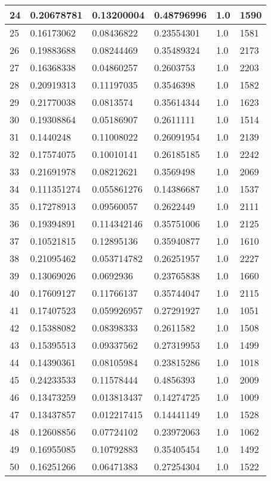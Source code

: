 \begin{longtable}{|l|l|l|l|l|l|}
24 & 0.20678781 & 0.13200004 & 0.48796996 & 1.0 & 1590 \\ \hline 
25 & 0.16173062 & 0.08436822 & 0.23554301 & 1.0 & 1581 \\ \hline 
26 & 0.19883688 & 0.08244469 & 0.35489324 & 1.0 & 2173 \\ \hline 
27 & 0.16368338 & 0.04860257 & 0.2603753 & 1.0 & 2203 \\ \hline 
28 & 0.20919313 & 0.11197035 & 0.3546398 & 1.0 & 1582 \\ \hline 
29 & 0.21770038 & 0.0813574 & 0.35614344 & 1.0 & 1623 \\ \hline 
30 & 0.19308864 & 0.05186907 & 0.2611111 & 1.0 & 1514 \\ \hline 
31 & 0.1440248 & 0.11008022 & 0.26091954 & 1.0 & 2139 \\ \hline 
32 & 0.17574075 & 0.10010141 & 0.26185185 & 1.0 & 2242 \\ \hline 
33 & 0.21691978 & 0.08212621 & 0.3569498 & 1.0 & 2069 \\ \hline 
34 & 0.111351274 & 0.055861276 & 0.14386687 & 1.0 & 1537 \\ \hline 
35 & 0.17278913 & 0.09560057 & 0.2622449 & 1.0 & 2111 \\ \hline 
36 & 0.19394891 & 0.114342146 & 0.35751006 & 1.0 & 2125 \\ \hline 
37 & 0.10521815 & 0.12895136 & 0.35940877 & 1.0 & 1610 \\ \hline 
38 & 0.21095462 & 0.053714782 & 0.26251957 & 1.0 & 2227 \\ \hline 
39 & 0.13069026 & 0.0692936 & 0.23765838 & 1.0 & 1660 \\ \hline 
40 & 0.17609127 & 0.11766137 & 0.35744047 & 1.0 & 2115 \\ \hline 
41 & 0.17407523 & 0.059926957 & 0.27291927 & 1.0 & 1051 \\ \hline 
42 & 0.15388082 & 0.08398333 & 0.2611582 & 1.0 & 1508 \\ \hline 
43 & 0.15395513 & 0.09337562 & 0.27319953 & 1.0 & 1499 \\ \hline 
44 & 0.14390361 & 0.08105984 & 0.23815286 & 1.0 & 1018 \\ \hline 
45 & 0.24233533 & 0.11578444 & 0.4856393 & 1.0 & 2009 \\ \hline 
46 & 0.13473259 & 0.013813437 & 0.14274725 & 1.0 & 1009 \\ \hline 
47 & 0.13437857 & 0.012217415 & 0.14441149 & 1.0 & 1528 \\ \hline 
48 & 0.12608856 & 0.07724102 & 0.23972063 & 1.0 & 1062 \\ \hline 
49 & 0.16955085 & 0.10792883 & 0.35405454 & 1.0 & 1492 \\ \hline 
50 & 0.16251266 & 0.06471383 & 0.27254304 & 1.0 & 1522 \\ \hline 
\end{longtable}